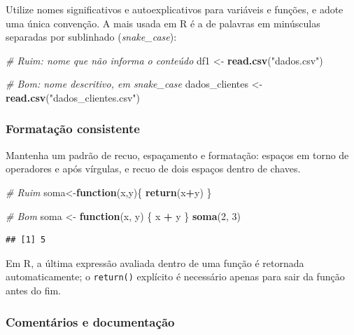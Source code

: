 \documentclass[
]{book}
\newenvironment{Shaded}{\begin{snugshade}}{\end{snugshade}}
\newcommand{\CommentTok}[1]{\textcolor[rgb]{0.56,0.35,0.01}{\textit{#1}}}
\newcommand{\ControlFlowTok}[1]{\textcolor[rgb]{0.13,0.29,0.53}{\textbf{#1}}}
\newcommand{\DecValTok}[1]{\textcolor[rgb]{0.00,0.00,0.81}{#1}}
\newcommand{\FunctionTok}[1]{\textcolor[rgb]{0.13,0.29,0.53}{\textbf{#1}}}
\newcommand{\NormalTok}[1]{#1}
\newcommand{\OtherTok}[1]{\textcolor[rgb]{0.56,0.35,0.01}{#1}}
\newcommand{\SpecialCharTok}[1]{\textcolor[rgb]{0.81,0.36,0.00}{\textbf{#1}}}
\newcommand{\StringTok}[1]{\textcolor[rgb]{0.31,0.60,0.02}{#1}}
\begin{document}
Utilize nomes significativos e autoexplicativos para variáveis e funções, e adote uma única convenção. A mais usada em R é a de palavras em minúsculas separadas por sublinhado (\emph{snake\_case}):

\begin{Shaded}
\begin{Highlighting}[]
\CommentTok{\# Ruim: nome que não informa o conteúdo}
\NormalTok{df1 }\OtherTok{\textless{}{-}} \FunctionTok{read.csv}\NormalTok{(}\StringTok{"dados.csv"}\NormalTok{)}

\CommentTok{\# Bom: nome descritivo, em snake\_case}
\NormalTok{dados\_clientes }\OtherTok{\textless{}{-}} \FunctionTok{read.csv}\NormalTok{(}\StringTok{"dados\_clientes.csv"}\NormalTok{)}
\end{Highlighting}
\end{Shaded}

\subsubsection{Formatação consistente}\label{formatauxe7uxe3o-consistente}

Mantenha um padrão de recuo, espaçamento e formatação: espaços em torno de operadores e após vírgulas, e recuo de dois espaços dentro de chaves.

\begin{Shaded}
\begin{Highlighting}[]
\CommentTok{\# Ruim}
\NormalTok{soma}\OtherTok{\textless{}{-}}\ControlFlowTok{function}\NormalTok{(x,y)\{}
\FunctionTok{return}\NormalTok{(x}\SpecialCharTok{+}\NormalTok{y)}
\NormalTok{\}}

\CommentTok{\# Bom}
\NormalTok{soma }\OtherTok{\textless{}{-}} \ControlFlowTok{function}\NormalTok{(x, y) \{}
\NormalTok{  x }\SpecialCharTok{+}\NormalTok{ y}
\NormalTok{\}}
\FunctionTok{soma}\NormalTok{(}\DecValTok{2}\NormalTok{, }\DecValTok{3}\NormalTok{)}
\end{Highlighting}
\end{Shaded}

\begin{verbatim}
## [1] 5
\end{verbatim}

Em R, a última expressão avaliada dentro de uma função é retornada automaticamente; o \texttt{return()} explícito é necessário apenas para sair da função antes do fim.

\subsubsection{Comentários e documentação}\label{comentuxe1rios-e-documentauxe7uxe3o}
\end{document}
